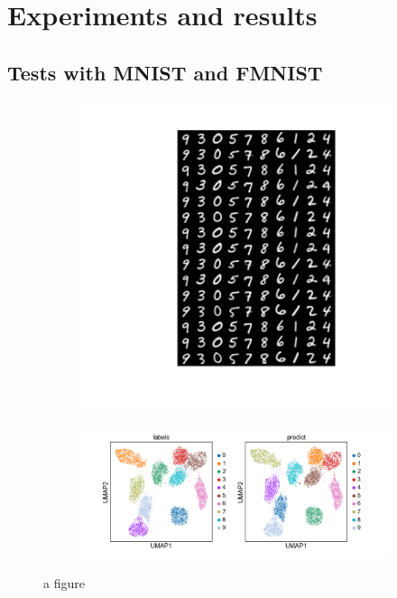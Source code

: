 \documentclass[11pt, a4paper]{report}
\theoremstyle{plain}
\theoremstyle{definition}
\theoremstyle{remark}
\begin{document}
\chapter{Experiments and results}
\section{Tests with MNIST and FMNIST}

\begin{figure}
\begin{framed}
\centering
\begin{subfigure}[b]{0.4\textwidth}
\includegraphics[width=\textwidth]{images/model_mnist_10c_generation.png}
\caption{}
\end{subfigure}
\begin{subfigure}[b]{0.4\textwidth}
\includegraphics[width=\textwidth]{images/model_mnist_10c_umap.png}
\caption{}
\end{subfigure}
\caption{a figure}
\label{fig:myfig}
\end{framed}
\end{figure}
\end{document}
